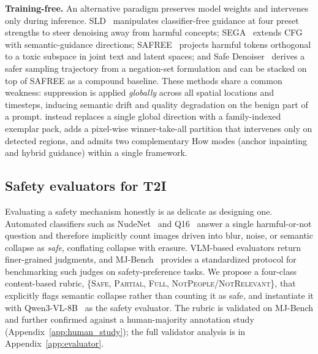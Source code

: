 \textbf{Training-free.} An alternative paradigm preserves model weights and intervenes only during inference. SLD~\citep{schramowski2023safe} manipulates classifier-free guidance at four preset strengths to steer denoising away from harmful concepts; SEGA~\citep{brack2023sega} extends CFG with semantic-guidance directions; SAFREE~\citep{yoon2024safree} projects harmful tokens orthogonal to a toxic subspace in joint text and latent spaces; and Safe Denoiser~\citep{kim2025training} derives a safer sampling trajectory from a negation-set formulation and can be stacked on top of SAFREE as a compound baseline. These methods share a common weakness: suppression is applied \emph{globally} across all spatial locations and timesteps, inducing semantic drift and quality degradation on the benign part of a prompt. \ours{} instead replaces a single global direction with a family-indexed exemplar pack, adds a pixel-wise winner-take-all partition that intervenes only on detected regions, and admits two complementary How modes (anchor inpainting and hybrid guidance) within a single framework.

\subsection{Safety evaluators for T2I}
Evaluating a safety mechanism honestly is as delicate as designing one. Automated classifiers such as NudeNet~\citep{notai_nudenet_2019} and Q16~\citep{schramowski2022can} answer a single harmful-or-not question and therefore implicitly count images driven into blur, noise, or semantic collapse as \emph{safe}, conflating collapse with erasure. VLM-based evaluators return finer-grained judgments, and MJ-Bench~\citep{chen2024mj} provides a standardized protocol for benchmarking such judges on safety-preference tasks. We propose a four-class content-based rubric, \{\textsc{Safe}, \textsc{Partial}, \textsc{Full}, \textsc{NotPeople}/\textsc{NotRelevant}\}, that explicitly flags semantic collapse rather than counting it as safe, and instantiate it with Qwen3-VL-8B~\citep{bai2025qwen3} as the safety evaluator. The rubric is validated on MJ-Bench and further confirmed against a human-majority annotation study (Appendix~\ref{app:human_study}); the full validator analysis is in Appendix~\ref{app:evaluator}.
